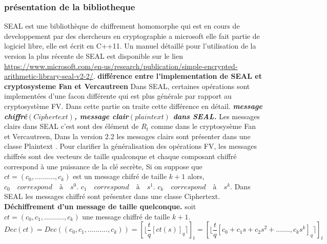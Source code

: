 \documentclass[a4paper,11pt]{report}
\begin{document}
\subsubsection{présentation de la bibliotheque}
SEAL est une bibliothèque de chiffrement homomorphe qui est en cours de developpement par des chercheurs en cryptographie a microsoft elle fait partie de logiciel libre, elle est écrit en C++11.
Un manuel détaillé pour l'utilisation de la version la plus récente de SEAL est disponible sur le lien \url{https://www.microsoft.com/en-us/research/publication/simple-encrypted-arithmetic-library-seal-v2-2/}. \newline
 \newline
\textbf{différence entre l'implementation de SEAL et cryptosysteme Fan et Vercautreen}  \newline
Dans SEAL, certaines opérations sont implementées d'une facon différente qui est plus générale par rapport au cryptosystème FV.\newline
Dans cette partie on traite cette différence en détail.\newline
\textbf{\textit{message chiffré$(Ciphertext)$, message clair$(plaintext)$ dans SEAL.}}\newline
Les messages clairs dans SEAL c'est sont des élément de $R_t$ comme dans le cryptosysème Fan et Vercautreen,
Dans la version 2.2 les messages clairs sont présenter dans une classe Plaintext .\newline
Pour clarifier la généralisation des opérations FV, les messages chiffrés sont des vecteurs de taille qualconque et chaque composant chiffré correspond à une puissance de la clé secrète, Si on suppose que $ct = (c_0,..........,c_k)$ est un message chifré de taille $k+1$ alors,\newline
$c_0\quad correspond\quad à\quad s^0.$\newline
$c_1\quad correspond\quad à\quad s^1.$\newline
$c_k\quad correspond\quad à\quad s^k.$
\newline
 Dans SEAL les messages chiffré sont présenter dans une classe Ciphertext.\newline
 \textbf{Déchiffrement d'un message de taille quelconque.}\newline
soit $ct = (c_0, c_1, .........., c_k)$ une message chiffré de taille $k+1.$\newline
$Dec(ct) = Dec((c_0, c_1, .........., c_k)) = [\lfloor\dfrac{t}{q}[ct(s)]_q\rceil]_t = [\lfloor\dfrac{t}{q}[c_0 + c_1s+c_2s^2+.......,c_ks^k]_q\rceil]_t$\newline
\end{document}
